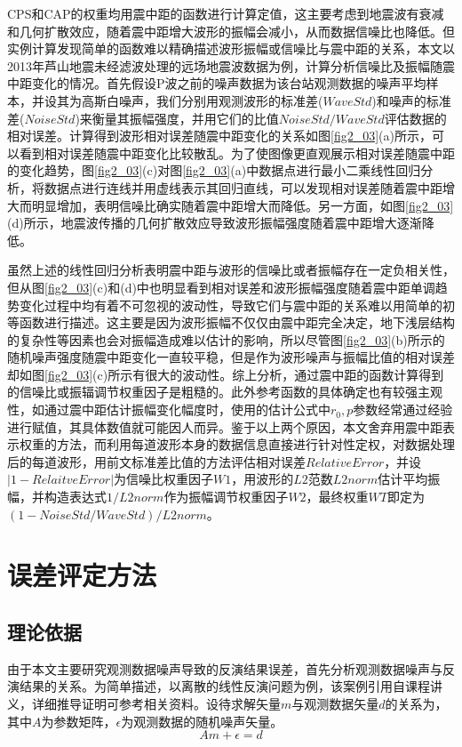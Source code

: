CPS和CAP的权重均用震中距的函数进行计算定值，这主要考虑到地震波有衰减和几何扩散效应，随着震中距增大波形的振幅会减小，从而数据信噪比也降低。但实例计算发现简单的函数难以精确描述波形振幅或信噪比与震中距的关系，本文以2013年芦山地震未经滤波处理的远场地震波数据为例，计算分析信噪比及振幅随震中距变化的情况。首先假设P波之前的噪声数据为该台站观测数据的噪声平均样本，并设其为高斯白噪声，我们分别用观测波形的标准差($WaveStd$)和噪声的标准差($NoiseStd$)来衡量其振幅强度，并用它们的比值$NoiseStd/WaveStd$评估数据的相对误差。计算得到波形相对误差随震中距变化的关系如图\ref{fig2_03}(a)所示，可以看到相对误差随震中距变化比较散乱。为了使图像更直观展示相对误差随震中距的变化趋势，图\ref{fig2_03}(c)对图\ref{fig2_03}(a)中数据点进行最小二乘线性回归分析，将数据点进行连线并用虚线表示其回归直线，可以发现相对误差随着震中距增大而明显增加，表明信噪比确实随着震中距增大而降低。另一方面，如图\ref{fig2_03}(d)所示，地震波传播的几何扩散效应导致波形振幅强度随着震中距增大逐渐降低。

虽然上述的线性回归分析表明震中距与波形的信噪比或者振幅存在一定负相关性，但从图\ref{fig2_03}(c)和(d)中也明显看到相对误差和波形振幅强度随着震中距单调趋势变化过程中均有着不可忽视的波动性，导致它们与震中距的关系难以用简单的初等函数进行描述。这主要是因为波形振幅不仅仅由震中距完全决定，地下浅层结构的复杂性等因素也会对振幅造成难以估计的影响，所以尽管图\ref{fig2_03}(b)所示的随机噪声强度随震中距变化一直较平稳，但是作为波形噪声与振幅比值的相对误差却如图\ref{fig2_03}(c)所示有很大的波动性。综上分析，通过震中距的函数计算得到的信噪比或振辐调节权重因子是粗糙的。此外参考函数的具体确定也有较强主观性，如\citet{Zhu1996}通过震中距估计振幅变化幅度时，使用的估计公式中$r_0,p$参数经常通过经验进行赋值，其具体数值就可能因人而异。鉴于以上两个原因，本文舍弃用震中距表示权重的方法，而利用每道波形本身的数据信息直接进行针对性定权，对数据处理后的每道波形，用前文标准差比值的方法评估相对误差$RelativeError$，并设$|1-RelaitveError|$为信噪比权重因子$W1$，用波形的$L2$范数$L2norm$估计平均振幅，并构造表达式$1/L2norm$作为振幅调节权重因子$W2$，最终权重$WT$即定为$(1-NoiseStd/WaveStd)/L2norm$。

\section{误差评定方法}

\subsection{理论依据}
由于本文主要研究观测数据噪声导致的反演结果误差，首先分析观测数据噪声与反演结果的关系。为简单描述，以离散的线性反演问题为例，该案例引用自课程讲义\citep{zhu2009}，详细推导证明可参考相关资料。设待求解矢量$m$与观测数据矢量$d$的关系为，其中$A$为参数矩阵，$\epsilon$为观测数据的随机噪声矢量。
\begin{equation}
\label{eq2_17}
	Am+\epsilon=d
\end{equation}

